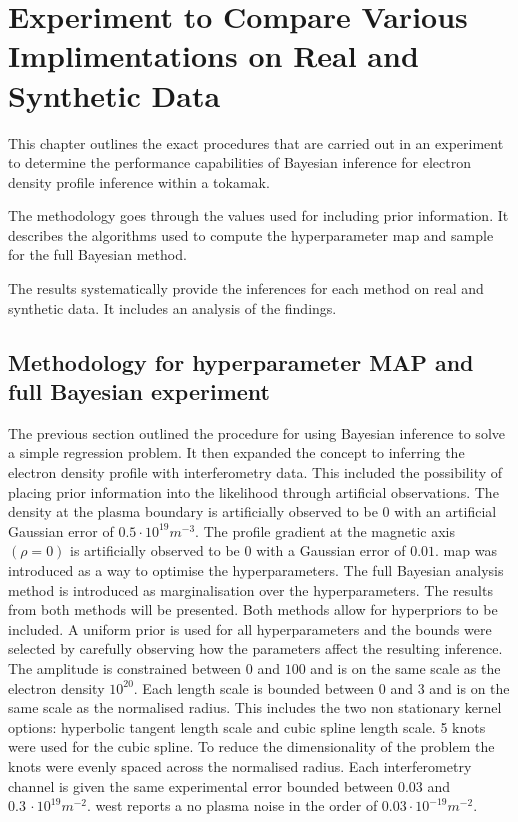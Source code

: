 \chapter{Experiment to Compare Various Implimentations on Real and Synthetic Data}

This chapter outlines the exact procedures that are carried out in an experiment to determine the performance capabilities of Bayesian inference for electron density profile inference within a tokamak.

The methodology goes through the values used for including prior information. It describes the algorithms used to compute the hyperparameter \gls{map} and sample for the full Bayesian method.

The results systematically provide the inferences for each method on real and synthetic data. It includes an analysis of the findings.

\section{Methodology for hyperparameter MAP and full Bayesian experiment}
The previous section outlined the procedure for using Bayesian inference to solve a simple regression problem. It then expanded the concept to inferring the electron density profile with interferometry data. This included the possibility of placing prior information into the likelihood through artificial observations. The density at the plasma boundary is artificially observed to be 0 with an artificial Gaussian error of $0.5 \cdot 10^{19} m^{-3}$. The profile gradient at the magnetic axis $(\rho=0)$ is artificially observed to be 0 with a Gaussian error of $0.01$. \gls{map} was introduced as a way to optimise the hyperparameters. The full Bayesian analysis method is introduced as marginalisation over the hyperparameters. The results from both methods will be presented. Both methods allow for hyperpriors to be included. A uniform prior is used for all hyperparameters and the bounds were selected by carefully observing how the parameters affect the resulting inference. The amplitude is constrained between $0$ and $100$ and is on the same scale as the electron density $10^{20}$. Each length scale is bounded between $0$ and $3$ and is on the same scale as the normalised radius. This includes the two non stationary kernel options: hyperbolic tangent length scale and cubic spline length scale. 5 knots were used for the cubic spline. To reduce the dimensionality of the problem the knots were evenly spaced across the normalised radius. Each interferometry channel is given the same experimental error bounded between $0.03$ and $0.3 \, \cdot 10^{19}m^{-2}$. \gls{west} reports a no plasma noise in the order of $0.03 \cdot10^{-19}m^{-2}$. 


